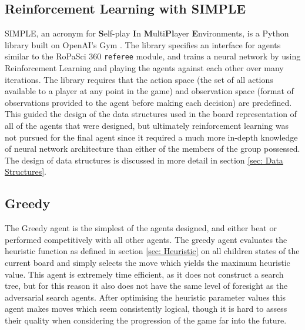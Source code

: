 \documentclass{article}
\begin{document}
\subsection{Reinforcement Learning with SIMPLE \cite{SIMPLE}}
SIMPLE, an acronym for \textbf{S}elf-play \textbf{I}n \textbf{M}ulti\textbf{Pl}ayer \textbf{E}nvironments, is a Python library built on OpenAI's Gym \cite{brockman2016openai}. The library specifies an interface for agents similar to the RoPaSci 360 \verb|referee| module, and trains a neural network by using Reinforcement Learning and playing the agents against each other over many iterations. The library requires that the action space (the set of all actions available to a player at any point in the game) and observation space (format of observations provided to the agent before making each decision) are predefined. This guided the design of the data structures used in the board representation of all of the agents that were designed, but ultimately reinforcement learning was not pursued for the final agent since it required a much more in-depth knowledge of neural network architecture than either of the members of the group possessed.\\[2mm]
The design of data structures is discussed in more detail in section \ref{sec: Data Structures}.

\subsection{Greedy}
The Greedy agent is the simplest of the agents designed, and either beat or performed competitively with all other agents. The greedy agent evaluates the heuristic function as defined in section \ref{sec: Heuristic} on all children states of the current board and simply selects the move which yields the maximum heuristic value. This agent is extremely time efficient, as it does not construct a search tree, but for this reason it also does not have the same level of foresight as the adversarial search agents. After optimising the heuristic parameter values this agent makes moves which seem consistently logical, though it is hard to assess their quality when considering the progression of the game far into the future.
\end{document}
